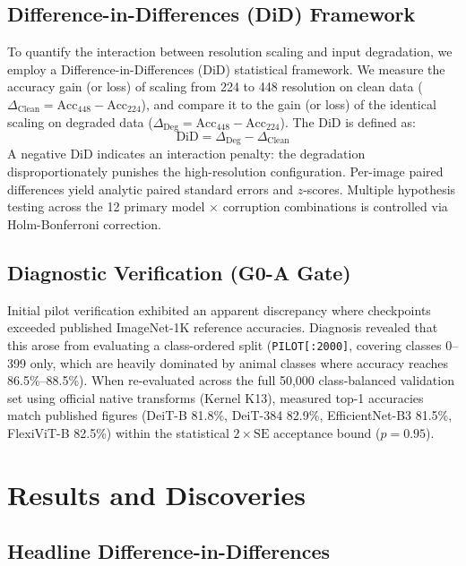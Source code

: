 \documentclass[10pt,twocolumn,letterpaper]{article}
\begin{document}
\subsection{Difference-in-Differences (DiD) Framework}
To quantify the interaction between resolution scaling and input degradation, we employ a Difference-in-Differences (DiD) statistical framework. We measure the accuracy gain (or loss) of scaling from 224 to 448 resolution on clean data ($\Delta_{\text{Clean}} = \text{Acc}_{448} - \text{Acc}_{224}$), and compare it to the gain (or loss) of the identical scaling on degraded data ($\Delta_{\text{Deg}} = \text{Acc}_{448} - \text{Acc}_{224}$). The DiD is defined as:
\begin{equation}
\text{DiD} = \Delta_{\text{Deg}} - \Delta_{\text{Clean}}
\end{equation}
A negative DiD indicates an interaction penalty: the degradation disproportionately punishes the high-resolution configuration. Per-image paired differences yield analytic paired standard errors and $z$-scores. Multiple hypothesis testing across the 12 primary model $\times$ corruption combinations is controlled via Holm-Bonferroni correction.

\subsection{Diagnostic Verification (G0-A Gate)}
Initial pilot verification exhibited an apparent discrepancy where checkpoints exceeded published ImageNet-1K reference accuracies. Diagnosis revealed that this arose from evaluating a class-ordered split (\texttt{PILOT[:2000]}, covering classes 0--399 only, which are heavily dominated by animal classes where accuracy reaches 86.5\%--88.5\%). When re-evaluated across the full 50,000 class-balanced validation set using official native transforms (Kernel K13), measured top-1 accuracies match published figures (DeiT-B 81.8\%, DeiT-384 82.9\%, EfficientNet-B3 81.5\%, FlexiViT-B 82.5\%) within the statistical $2\times\text{SE}$ acceptance bound ($p = 0.95$).

\section{Results and Discoveries}

\subsection{Headline Difference-in-Differences}
\end{document}
